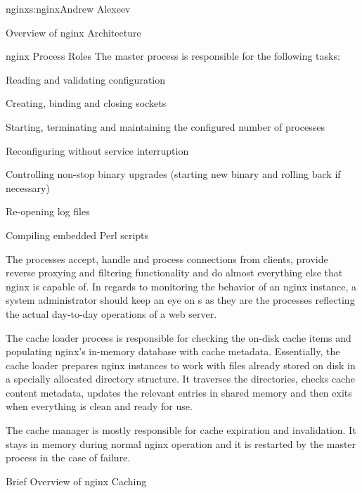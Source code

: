 \begin{aosachapter}{nginx}{s:nginx}{Andrew Alexeev}
\begin{aosasect1}{Overview of nginx Architecture}
\begin{aosasect2}{nginx Process Roles}
The master process is responsible for the following tasks:

\begin{aosaitemize}

\item Reading and validating configuration

\item Creating, binding and closing sockets

\item Starting, terminating and maintaining the configured number of
   processes

\item Reconfiguring without service interruption

\item Controlling non-stop binary upgrades (starting new binary and
rolling back if necessary)

\item Re-opening log files

\item Compiling embedded Perl scripts

\end{aosaitemize}

The  processes accept, handle and process connections
from clients, provide reverse proxying and filtering functionality and
do almost everything else that nginx is capable of. In regards to
monitoring the behavior of an nginx instance, a system administrator
should keep an eye on s as they are the processes
reflecting the actual day-to-day operations of a web server.

The cache loader process is responsible for checking the on-disk cache
items and populating nginx's in-memory database with cache
metadata. Essentially, the cache loader prepares nginx instances to
work with files already stored on disk in a specially allocated
directory structure. It traverses the directories, checks cache
content metadata, updates the relevant entries in shared memory and
then exits when everything is clean and ready for use.

The cache manager is mostly responsible for cache expiration and
invalidation. It stays in memory during normal nginx operation and it
is restarted by the master process in the case of failure.

\end{aosasect2}

\begin{aosasect2}{Brief Overview of nginx Caching}


\end{aosasect2}
\end{aosasect1}
\end{aosachapter}
